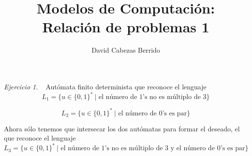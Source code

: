 \documentclass[12pt,spanish]{article}
\theoremstyle{definition}
\theoremstyle{remark}
\newtheorem{exercise}{Ejercicio}%
\begin{document}
\title{Modelos de Computación: \\ Relación de problemas 1}
\author{David Cabezas Berrido}
\date{\vspace{-5mm}}
\maketitle

\setcounter{exercise}{16}
\begin{exercise}~ Autómata finito determinista que reconoce el
  lenguaje
  \[L_1=\{u\in\{0,1\}^* \ | \text{ el número de 1's no es múltiplo de 3}\}\] \vspace{-10mm}
  \begin{figure}[H]
  \centering
\end{figure}
\vspace{-10mm}
  \[L_2=\{u\in\{0,1\}^* \ |\text{ el número de 0's es par}\}\] \vspace{-10mm}
  \begin{figure}[H]
  \centering
  \end{figure} \vspace{-5mm}
  Ahora sólo tenemos que intersecar los dos autómatas para formar el
  deseado, el que reconoce el lenguaje
  \[L_3=\{u\in\{0,1\}^* \ |\text{ el número de 1's no es múltiplo de 3 y el número de 0's es par}\}\]
  \begin{figure}[H]
  \centering
  \end{figure}
  
\end{exercise}
\end{document}

